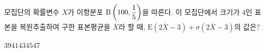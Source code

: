 모집단의 확률변수 $X$가 이항분포 $\mathrm{B}\left(100{,}\mkern3mu\mathopen{}\dfrac{1}{5}\right)$을 따른다. 이 모집단에서 크기가 $4$인 표본을 복원추출하여 구한 표본평균을 $\overline{X}$라 할 때, $\mathrm{E}(2\overline{X}-3)+\sigma(2\overline{X}-3)$의 값은?
\begin{choices32}{$39$}{$41$}{$43$}{$45$}{$47$}\end{choices32}

